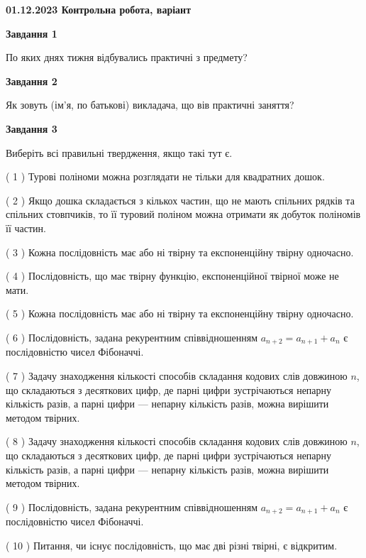 \documentclass[12pt, ukrainian]{article}
\begin{document}
\begin {large}

\textbf{01.12.2023 Контрольна робота, варіант  }\par


{
{\begin {center}\textbf{Завдання 1}\end {center}}\par
По яких днях тижня відбувались практичні з предмету?\par
{\begin {center}\textbf{Завдання 2}\end {center}}\par
Як зовуть (ім'я, по батькові) викладача, що вів практичні заняття?\par
{\begin {center}\textbf{Завдання 3}\end {center}}\par
Виберіть всі правильні твердження, якщо такі тут є.\par
\vspace{2mm}
( 1 ) Турові поліноми можна розглядати не тільки для квадратних дошок.%

( 2 ) Якщо дошка складається з кількох частин, що не мають спільних рядків та спільних стовпчиків, то її туровий поліном можна отримати як добуток поліномів її частин.%

( 3 ) Кожна послідовність має або ні твірну та експоненційну твірну одночасно.%

( 4 ) Послідовність, що має твірну функцію, експоненційної твірної може не мати.%

( 5 ) Кожна послідовність має або ні твірну та експоненційну твірну одночасно.%

( 6 ) Послідовність, задана рекурентним співвідношенням $a_{n+2}=a_{n+1}+a_{n}$ є послідовністю чисел Фібоначчі.%

( 7 ) Задачу знаходження кількості способів складання кодових слів довжиною $n$, що складаються з десяткових цифр, де парні цифри зустрічаються непарну кількість разів, а парні цифри — непарну кількість разів, можна вирішити методом твірних.%

( 8 ) Задачу знаходження кількості способів складання кодових слів довжиною $n$, що складаються з десяткових цифр, де парні цифри зустрічаються непарну кількість разів, а парні цифри — непарну кількість разів, можна вирішити методом твірних.%

( 9 ) Послідовність, задана рекурентним співвідношенням $a_{n+2}=a_{n+1}+a_{n}$ є послідовністю чисел Фібоначчі.%

( 10 ) Питання, чи існує послідовність, що має дві різні твірні, є відкритим.%
}
\end {large}

\vspace{4mm}
\newpage
\end{document}
